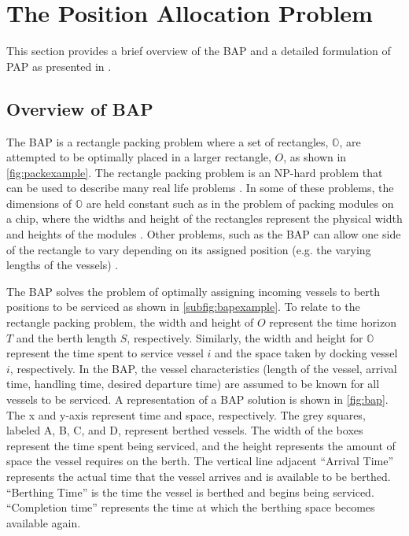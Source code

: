 \documentclass[utf8]{FrontiersinHarvard}
\let\cite\citep                                       %
\begin{document}
\section{The Position Allocation Problem}
\label{sec:the-position-allocation-problem}
This section provides a brief overview of the BAP and a detailed formulation of PAP as presented in
\cite{qarebagh-2019-optim-sched}.

\subsection{Overview of BAP}
\label{sec:overview-of-bap}
The BAP is a rectangle packing problem where a set of rectangles, \(\mathbb{O}\), are attempted to be optimally placed in
a larger rectangle, \(O\), as shown in \autoref{fig:packexample}. The rectangle packing problem is an NP-hard problem that
can be used to describe many real life problems \cite{bruin-2013-rectan-packin,murata-1995-rectan}. In some of these
problems, the dimensions of \(\mathbb{O}\) are held constant such as in the problem of packing modules on a chip, where
the widths and height of the rectangles represent the physical width and heights of the modules
\cite{murata-1995-rectan}. Other problems, such as the BAP can allow one side of the rectangle to vary depending on its
assigned position (e.g. the varying lengths of the vessels) \cite{buhrkal-2011-model-discr}.

The BAP solves the problem of optimally assigning incoming vessels to berth positions to be serviced as shown in
 \autoref{subfig:bapexample}. To relate to the rectangle packing problem, the width and height of \(O\) represent the time
 horizon \(T\) and the berth length \(S\), respectively. Similarly, the width and height for \(\mathbb{O}\) represent the time
 spent to service vessel \(i\) and the space taken by docking vessel \(i\), respectively. In the BAP, the vessel
 characteristics (length of the vessel, arrival time, handling time, desired departure time) are assumed to be known for
 all vessels to be serviced. A representation of a BAP solution is shown in \autoref{fig:bap}. The x and y-axis
 represent time and space, respectively. The grey squares, labeled A, B, C, and D, represent berthed vessels. The width
 of the boxes represent the time spent being serviced, and the height represents the amount of space the vessel requires
 on the berth. The vertical line adjacent ``Arrival Time'' represents the actual time that the vessel arrives and is
 available to be berthed. ``Berthing Time'' is the time the vessel is berthed and begins being serviced. ``Completion
 time'' represents the time at which the berthing space becomes available again.
\end{document}

